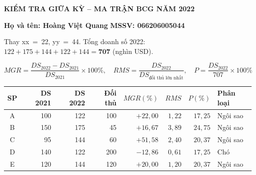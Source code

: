 \documentclass[a4paper]{article}
\begin{document}
\begin{center}
  \textbf{\large KIỂM TRA GIỮA KỲ -- MA TRẬN BCG NĂM 2022}
\end{center}

\textbf{Họ và tên: Hoàng Việt Quang} \hfill \textbf{MSSV: 066206005044}

\bigskip

Thay xx~=~22, yy~=~44. Tổng doanh số 2022: $122+175+144+122+144=\mathbf{707}$ (nghìn USD).

\[
MGR=\frac{DS_{2022}-DS_{2021}}{DS_{2021}}\!\times\!100\%,\quad
RMS=\frac{DS_{2022}}{DS_{\text{đối thủ lớn nhất}}},\quad
P=\frac{DS_{2022}}{707}\!\times\!100\%
\]

\begin{center}
\begin{tabular}{|c|r|r|r|r|r|r|l|}
\hline
SP & DS 2021 & DS 2022 & Đối thủ & $MGR(\%)$ & $RMS$ & $P(\%)$ & Phân loại \\
\hline
A & 100 & 122 & 100 & $+22{,}00$ & $1{,}22$ & $17{,}25$ & Ngôi sao \\
\hline
B & 150 & 175 &  45 & $+16{,}67$ & $3{,}89$ & $24{,}75$ & Ngôi sao \\
\hline
C &  95 & 144 &  60 & $+51{,}58$ & $2{,}40$ & $20{,}37$ & Ngôi sao \\
\hline
D & 140 & 122 & 200 & $-12{,}86$ & $0{,}61$ & $17{,}25$ & Chó \\
\hline
E & 120 & 144 & 120 & $+20{,}00$ & $1{,}20$ & $20{,}37$ & Ngôi sao \\
\hline
\end{tabular}
\end{center}
\end{document}
